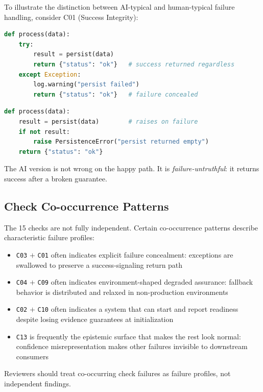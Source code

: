 \documentclass[11pt]{article}
\newcommand{\checkid}[1]{\texttt{#1}}
\begin{document}
To illustrate the distinction between AI-typical and human-typical failure handling,
consider C01 (Success Integrity):

\begin{lstlisting}[language=Python, caption={AI-typical: failure concealed}]
def process(data):
    try:
        result = persist(data)
        return {"status": "ok"}   # success returned regardless
    except Exception:
        log.warning("persist failed")
        return {"status": "ok"}   # failure concealed
\end{lstlisting}

\begin{lstlisting}[language=Python, caption={Human-typical: failure propagated}]
def process(data):
    result = persist(data)        # raises on failure
    if not result:
        raise PersistenceError("persist returned empty")
    return {"status": "ok"}
\end{lstlisting}

The AI version is not wrong on the happy path. It is \emph{failure-untruthful}: it returns
success after a broken guarantee.

\subsection{Check Co-occurrence Patterns}

The 15 checks are not fully independent. Certain co-occurrence patterns describe
characteristic failure profiles:
\begin{itemize}
  \item \checkid{C03} $+$ \checkid{C01} often indicates explicit failure concealment:
        exceptions are swallowed to preserve a success-signaling return path
  \item \checkid{C04} $+$ \checkid{C09} often indicates environment-shaped degraded
        assurance: fallback behavior is distributed and relaxed in non-production environments
  \item \checkid{C02} $+$ \checkid{C10} often indicates a system that can start and report
        readiness despite losing evidence guarantees at initialization
  \item \checkid{C13} is frequently the epistemic surface that makes the rest look normal:
        confidence misrepresentation makes other failures invisible to downstream consumers
\end{itemize}

Reviewers should treat co-occurring check failures as failure profiles, not independent
findings.
\end{document}
